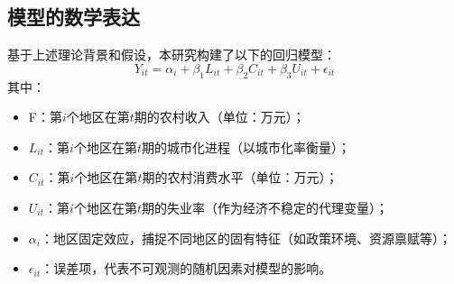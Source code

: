 \documentclass[12pt]{article}
\begin{document}
\subsection{模型的数学表达}
基于上述理论背景和假设，本研究构建了以下的回归模型：
\[
Y_{it} = \alpha_i + \beta_1 L_{it} + \beta_2 C_{it} + \beta_3 U_{it} + \epsilon_{it}
\]
其中：
\begin{itemize}
    \item F：第$i$个地区在第$t$期的农村收入（单位：万元）；
    \item $L_{it}$：第$i$个地区在第$t$期的城市化进程（以城市化率衡量）；
    \item $C_{it}$：第$i$个地区在第$t$期的农村消费水平（单位：万元）；
    \item $U_{it}$：第$i$个地区在第$t$期的失业率（作为经济不稳定的代理变量）；
    \item $\alpha_i$：地区固定效应，捕捉不同地区的固有特征（如政策环境、资源禀赋等）；
    \item $\epsilon_{it}$：误差项，代表不可观测的随机因素对模型的影响。
\end{itemize}
\end{document}
